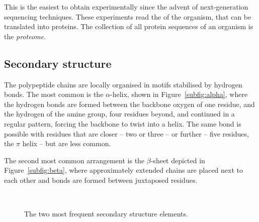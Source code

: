 This is the easiest to obtain experimentally since the advent of next-generation sequencing techniques.
These experiments read the \DNA{} of the organism, that can be translated into proteins.
The collection of all protein sequences of an organism is the \emph{proteome}.


\subsection{Secondary structure}
The polypeptide chains are locally organised in motifs stabilised by hydrogen bonds.
The most common is the $\alpha$-helix, \marginpar{$\alpha$} shown in Figure~\ref{subfig:alpha}, where the hydrogen bonds are formed between the backbone oxygen of one residue, and the hydrogen of the amine group, four residues beyond, and continued in a regular pattern, forcing the backbone to twist into a helix.
The same bond is possible with residues that are closer -- two or three -- or further  -- five residues, the $\pi$ helix -- but are less common.

The second most common arrangement is the $\beta$-sheet  \marginpar{$\beta$} depicted in Figure~\ref{subfig:beta}, where approximately extended chains are placed next to each other and bonds are formed between juxtaposed residues.


\begin{figure}[htbp]
	\centering
	\\
	\caption{The two most frequent secondary structure elements.}\label{fig:alpha_beta}
\end{figure}


